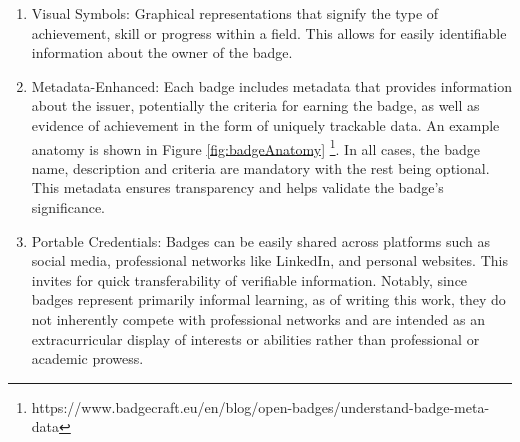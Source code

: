 \begin{enumerate}
  \addtolength{\itemsep}{-0.5\baselineskip} 
  \item Visual Symbols: Graphical representations that signify the type of achievement, skill or progress within a field. 
  This allows for easily identifiable information about the owner of the badge.
  \item Metadata-Enhanced: Each badge includes metadata that provides information about the issuer, potentially the criteria for earning the badge, as well as evidence of achievement in the form of uniquely trackable data. 
  An example anatomy is shown in Figure \ref {fig:badgeAnatomy} \footnote{https://www.badgecraft.eu/en/blog/open-badges/understand-badge-meta-data}. 
  In all cases, the badge name, description and criteria are mandatory with the rest being optional.
  This metadata ensures transparency and helps validate the badge's significance.
  \item Portable Credentials: Badges can be easily shared across platforms such as social media, professional networks like LinkedIn, and personal websites. 
  This invites for quick transferability of verifiable information. 
  Notably, since badges represent primarily informal learning, as of writing this work, they do not inherently compete with professional networks and are intended as an extracurricular display of interests or abilities rather than professional or academic prowess.
\end{enumerate}

